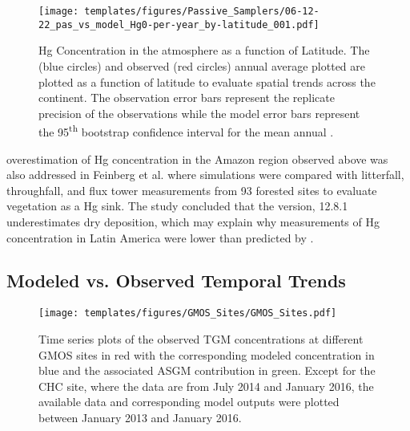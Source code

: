 \begin{figure}[H]
  \texttt{[image: templates/figures/Passive\_Samplers/06-12-22\_pas\_vs\_model\_Hg0-per-year\_by-latitude\_001.pdf]}
  \centering
  \caption[Hg Concentration in the atmosphere as a function of Latitude.]{Hg Concentration in the atmosphere as a function of Latitude. The \on (blue circles) and observed (red circles) annual average \hg plotted are plotted as a function of latitude to evaluate spatial trends across the continent. The observation error bars represent the replicate precision of the observations while the model error bars represent the 95\textsuperscript{th} bootstrap confidence interval for the mean annual \hg.}
  \label{fig:06-12-22_pas_vs_model_Hg0-per-year_by-latitude_001}
  
  
\end{figure}
\FloatBarrier
\begin{flushleft}
    \gcs overestimation of Hg concentration in the Amazon region observed above was also addressed in Feinberg et al.\cite{feinberg_evaluating_2022}  where \gc simulations were compared with litterfall, throughfall, and flux tower measurements from 93 forested sites to evaluate vegetation as a Hg sink. The study concluded that the \gc version, 12.8.1 underestimates \hg dry deposition, which may explain why measurements of Hg concentration in Latin America were lower than predicted by \gc. 

\end{flushleft}


\subsection{Modeled vs. Observed Temporal Trends}\label{c2_modeled_vs_observed_trends}
\begin{figure}[H]
\texttt{[image: templates/figures/GMOS\_Sites/GMOS\_Sites.pdf]}
\centering
\caption[Time series plots of the observed TGM concentrations at different GMOS sites.]{Time series plots of the observed TGM concentrations at different GMOS sites in red with the corresponding modeled concentration in blue and the associated ASGM contribution in green. Except for the CHC site, where the data are from July 2014 and January 2016, the available data and corresponding model outputs were plotted between January 2013 and January 2016.}
\label{fig:GMOSvsGC}
\end{figure}
\FloatBarrier


